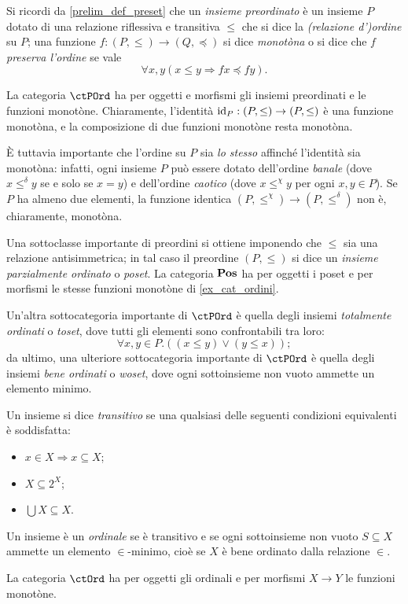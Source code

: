 \begin{example}\label{ex_cat_ordini}
	Si ricordi da \ref{prelim_def_preset} che un \emph{insieme preordinato} è un insieme \(P\) dotato di una relazione riflessiva e transitiva \(\le\) che si dice la \emph{(relazione d')ordine} su $P$; una funzione \(f  : (P,\le)\to (Q,\preceq)\) si dice \emph{monotòna} o si dice che \(f\) \emph{preserva l'ordine} se vale
	\[\forall x,y(x\le y\Rightarrow fx\preceq fy).\]

	La categoria \(\ctPOrd\) ha per oggetti e morfismi gli insiemi preordinati e le funzioni monotòne. Chiaramente, l'identità \(\mathrm{id}_P : (P,\le)\to (P,\le)\) è una funzione monotòna, e la composizione di due funzioni monotòne resta monotòna.

	\`E tuttavia importante che l'ordine su \(P\) sia \emph{lo stesso} affinché l'identità sia monotòna: infatti, ogni insieme \(P\) può essere dotato dell'ordine \emph{banale} (dove \(x \mathrel{\le^\delta} y\) se e solo se \(x=y\)) e dell'ordine \emph{caotico} (dove \(x\mathrel{\le^\chi} y\) per ogni \(x,y\in P\)). Se \(P\) ha almeno due elementi, la funzione identica \((P,\le^\chi)\to (P,\le^\delta)\) non è, chiaramente, monotòna.
\end{example}
\begin{remark}[po, wo e to]\label{po_wo_to}
	Una sottoclasse importante di preordini si ottiene imponendo che \(\le\) sia una relazione antisimmetrica; in tal caso il preordine \((P,\le)\) si dice un \emph{insieme parzialmente ordinato} o \emph{poset}. La categoria \(\mathbf{Pos}\) ha per oggetti i poset e per morfismi le stesse funzioni monotòne di \ref{ex_cat_ordini}.

	Un'altra sottocategoria importante di \(\ctPOrd\) è quella degli insiemi \emph{totalmente ordinati} o \emph{toset}, dove tutti gli elementi sono confrontabili tra loro:
	\[\forall x,y\in P.((x\le y)\lor (y\le x));\]
	da ultimo, una ulteriore sottocategoria importante di \(\ctPOrd\) è quella degli insiemi \emph{bene ordinati} o \emph{woset}, dove ogni sottoinsieme non vuoto ammette un elemento minimo.
\end{remark}
\begin{example}\label{ex_cat_ordinali}
	Un insieme si dice \emph{transitivo} se una qualsiasi delle seguenti condizioni equivalenti è soddisfatta:
	\begin{itemize}
		\item \(x\in X\Rightarrow x\subseteq X\);
		\item \(X\subseteq 2^X\);
		\item \(\bigcup X\subseteq X\).
	\end{itemize}
	Un insieme è un \emph{ordinale} se è transitivo e se ogni sottoinsieme non vuoto \(S\subseteq X\) ammette un elemento \(\in\)-minimo, cioè se \(X\) è bene ordinato dalla relazione \(\in\).

	La categoria \(\ctOrd\) ha per oggetti gli ordinali e per morfismi \(X\to Y\) le funzioni monotòne.
\end{example}
